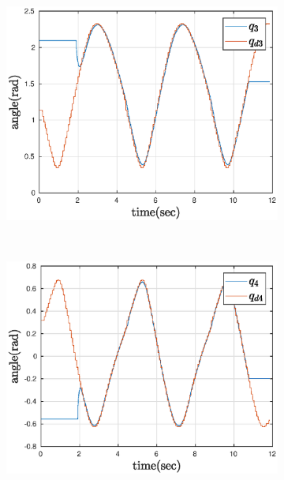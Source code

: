\begin{figure}[htbp]
\begin{subfigure}[htbp]{0.45\textwidth}
        \centering
        \includegraphics[width = \picsSiz\linewidth]{img/pathF3ff.eps}
        \caption{ }
    \end{subfigure}
    ~ 
    \begin{subfigure}[htbp]{0.45\textwidth}
        \centering
        \includegraphics[width = \picsSiz\linewidth]{img/pathF4ff.eps}
        \caption{ }
    \end{subfigure}
    ~
    \begin{subfigure}[htbp]{0.45\textwidth}
        \centering

\end{subfigure}
\end{figure}
